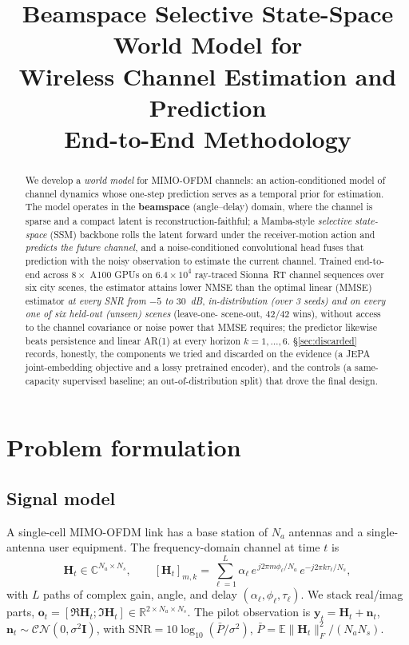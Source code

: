 \documentclass[11pt]{article}
\title{\textbf{Beamspace Selective State-Space World Model for\\ Wireless Channel Estimation and Prediction}\\[0.4em]
\large End-to-End Methodology}
\author{}
\date{}
\newcommand{\C}{\mathbb{C}}
\newcommand{\R}{\mathbb{R}}
\newcommand{\E}{\mathbb{E}}
\newcommand{\Hc}{\mathbf{H}}
\newcommand{\yv}{\mathbf{y}}
\begin{document}
\maketitle

\begin{abstract}
We develop a \emph{world model} for MIMO-OFDM channels: an action-conditioned model of channel
dynamics whose one-step prediction serves as a temporal prior for estimation. The model operates in
the \textbf{beamspace} (angle--delay) domain, where the channel is sparse and a compact latent is
reconstruction-faithful; a Mamba-style \emph{selective state-space} (SSM) backbone rolls the latent
forward under the receiver-motion action and \emph{predicts the future channel}, and a
noise-conditioned convolutional head fuses that prediction with the noisy observation to estimate the
current channel. Trained end-to-end across $8\times$ A100 GPUs on
$6.4{\times}10^4$ ray-traced Sionna~RT channel sequences over six city scenes, the estimator
attains lower NMSE than the optimal linear (MMSE) estimator \emph{at every SNR from $-5$ to $30$~dB},
\emph{in-distribution (over 3 seeds) and on every one of six held-out (unseen) scenes} (leave-one-
scene-out, $42/42$ wins), without access to the channel covariance or noise power that MMSE requires;
the predictor likewise beats persistence and linear AR(1) at every horizon $k=1,\dots,6$. \S\ref{sec:discarded} records, honestly, the components
we tried and discarded on the evidence (a JEPA joint-embedding objective and a lossy pretrained
encoder), and the controls (a same-capacity supervised baseline; an out-of-distribution split) that
drove the final design.
\end{abstract}

\tableofcontents

\section{Problem formulation}\label{sec:problem}

\subsection{Signal model}
A single-cell MIMO-OFDM link has a base station of $N_a$ antennas and a single-antenna user
equipment. The frequency-domain channel at time $t$ is
\begin{equation}
\Hc_t \in \C^{N_a \times N_s},\qquad
[\Hc_t]_{m,k} = \sum_{\ell=1}^{L} \alpha_{\ell}\,
e^{\,j 2\pi m\phi_\ell/N_a}\,e^{-j 2\pi k\tau_\ell/N_s},
\end{equation}
with $L$ paths of complex gain, angle, and delay $(\alpha_\ell,\phi_\ell,\tau_\ell)$. We stack
real/imag parts, $\mathbf{o}_t=[\Re\Hc_t;\Im\Hc_t]\in\R^{2\times N_a\times N_s}$. The pilot
observation is $\yv_t=\Hc_t+\mathbf{n}_t$, $\mathbf{n}_t\!\sim\!\mathcal{CN}(0,\sigma^2\mathbf I)$,
with $\mathrm{SNR}=10\log_{10}(\bar P/\sigma^2)$, $\bar P=\E\|\Hc_t\|_F^2/(N_aN_s)$.
\end{document}
